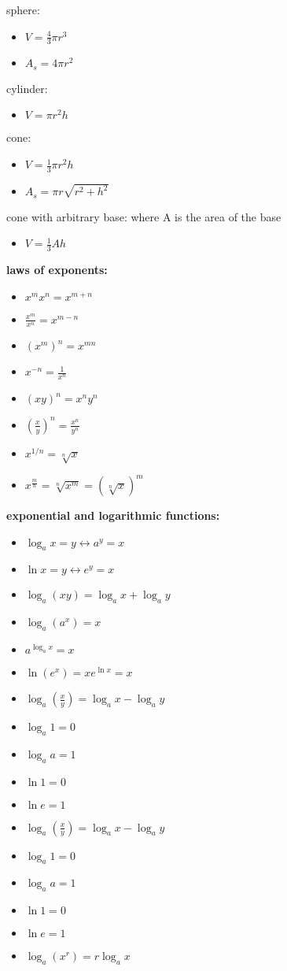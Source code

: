 \documentclass{article}
\begin{document}
	sphere:
		\begin{itemize}
			\item $V = \frac{4}{3}\pi r^3$
			\item $A_s = 4\pi r^2$
		\end{itemize}

	cylinder:
		\begin{itemize}
			\item $V = \pi r^2h$
		\end{itemize}

	cone:
		\begin{itemize}
			\item $V = \frac{1}{3}\pi r^2h$
			\item $A_s = \pi r\sqrt{r^2+h^2}$
		\end{itemize}

	cone with arbitrary base: where A is the area of the base
		\begin{itemize}
			\item $V = \frac{1}{3}Ah$
		\end{itemize}

\textbf{laws of exponents:} 
	\begin{itemize}
		\item $x^mx^n = x^{m+n}$
		\item $\frac{x^m}{x^n} = x^{m-n}$
		\item $(x^m)^n = x^{mn}$
		\item $x^{-n} = \frac{1}{x^n}$
		\item $(xy)^n = x^ny^n$
		\item $(\frac{x}{y})^n = \frac{x^n}{y^n}$ \item $x^{1/n} = \sqrt[n]{x}$
		\item $x^{\frac{m}{n}} = \sqrt[n]{x^m} = (\sqrt[n]{x})^m$
	\end{itemize}

\textbf{exponential and logarithmic functions:}
	\begin{itemize}
		\item $\log_ax = y \leftrightarrow a^y = x$
		\item $\ln x = y \leftrightarrow e^y = x$
		\item $\log_a(xy) = \log_ax + \log_ay$
		\item $\log_a(a^x) = x$
		\item $a^{\log_a x} = x$
		\item $\ln(e^x) = x e^{\ln x} = x$
		\item $\log_a(\frac{x}{y}) = \log_ax - \log_ay$
		\item $\log_a1 = 0$
		\item $\log_aa = 1$
		\item $\ln1 = 0$
		\item $\ln e = 1$
		\item $\log_a(\frac{x}{y}) = \log_ax - \log_ay$
		\item $\log_a1 = 0$
		\item $\log_aa = 1$
		\item $\ln1 = 0$
		\item $\ln e = 1$
		\item $\log_a(x^r) = r\log_ax$
	\end{itemize}
\end{document}
